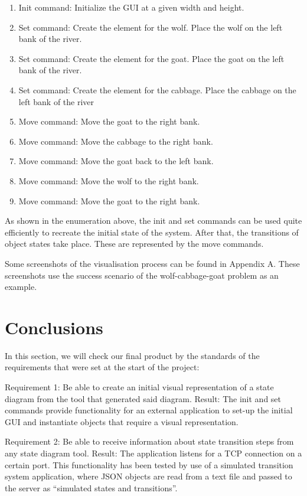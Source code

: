 \documentclass[11pt,a4paper]{article}
\begin{document}
\begin{enumerate}
	\item Init command: Initialize the GUI at a given width and height.
	\item Set command: Create the element for the wolf. Place the wolf on the left bank of the river.
	\item Set command: Create the element for the goat. Place the goat on the left bank of the river.
	\item Set command: Create the element for the cabbage. Place the cabbage on the left bank of the river
	\item Move command: Move the goat to the right bank.
	\item Move command: Move the cabbage to the right bank.
	\item Move command: Move the goat back to the left bank.
	\item Move command: Move the wolf to the right bank.
	\item Move command: Move the goat to the right bank.
\end{enumerate}

As shown in the enumeration above, the init and set commands can be used quite efficiently to recreate the initial state of the system. After that, the transitions of object states take place. These are represented by the move commands.

Some screenshots of the visualisation process can be found in Appendix A. These screenshots use the success scenario of the wolf-cabbage-goat problem as an example.

\section{Conclusions}

In this section, we will check our final product by the standards of the requirements that were set at the start of the project:

Requirement 1: Be able to create an initial visual representation of a state diagram from the tool that generated said diagram.
Result: The init and set commands provide functionality for an external application to set-up the initial GUI and instantiate objects that require a visual representation.

Requirement 2: Be able to receive information about state transition steps from any state diagram tool.
Result: The application listens for a TCP connection on a certain port. This functionality has been tested by use of a simulated transition system application, where JSON objects are read from a text file and passed to the server as ``simulated states and transitions''.
\end{document}
